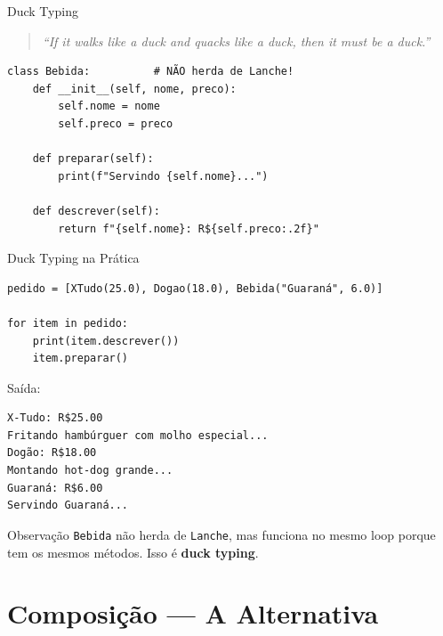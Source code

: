 \documentclass[aspectratio=169]{beamer}
\begin{document}
\begin{frame}[fragile]{Duck Typing}
  \begin{quote}
    \emph{``If it walks like a duck and quacks like a duck, then it must be a duck.''}
  \end{quote}

  \bigskip

  \begin{lstlisting}
class Bebida:          # NÃO herda de Lanche!
    def __init__(self, nome, preco):
        self.nome = nome
        self.preco = preco

    def preparar(self):
        print(f"Servindo {self.nome}...")

    def descrever(self):
        return f"{self.nome}: R${self.preco:.2f}"
  \end{lstlisting}
\end{frame}

\begin{frame}[fragile]{Duck Typing na Prática}
  \begin{lstlisting}
pedido = [XTudo(25.0), Dogao(18.0), Bebida("Guaraná", 6.0)]

for item in pedido:
    print(item.descrever())
    item.preparar()
  \end{lstlisting}

  Saída:
  \begin{lstlisting}[numbers=none]
X-Tudo: R$25.00
Fritando hambúrguer com molho especial...
Dogão: R$18.00
Montando hot-dog grande...
Guaraná: R$6.00
Servindo Guaraná...
  \end{lstlisting}

  \begin{alertblock}{Observação}
    \texttt{Bebida} não herda de \texttt{Lanche}, mas funciona no mesmo loop porque tem os mesmos métodos. Isso é \textbf{duck typing}.
  \end{alertblock}
\end{frame}

\section{Composição — A Alternativa}
\end{document}
